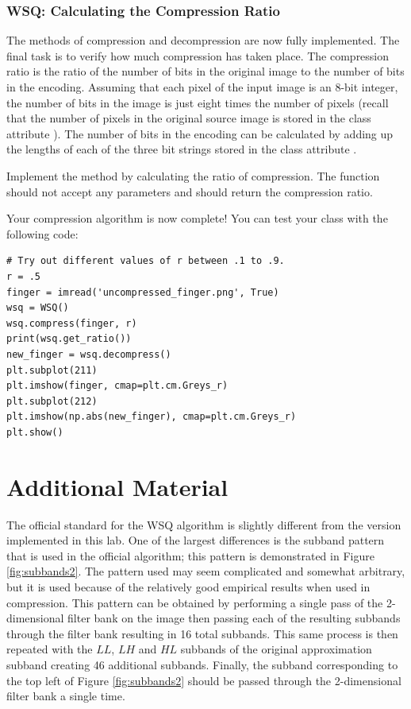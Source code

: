 \subsubsection*{WSQ: Calculating the Compression Ratio}
The methods of compression and decompression are now fully implemented. The final task is to verify how much compression has taken place.
The compression ratio is the ratio of the number of bits in the original image to the number of bits in the encoding.
Assuming that each pixel of the input image is an 8-bit integer, the number of bits in the image is just eight times the number of pixels
(recall that the number of pixels in the original source image is stored in the class attribute ).
The number of bits in the encoding can be calculated by adding up the lengths of each of the three bit strings stored in the class attribute .
\begin{problem}
Implement the method  by calculating the ratio of compression.
The function should not accept any parameters and should return the compression ratio.

Your compression algorithm is now complete!
You can test your class with the following code:
\begin{lstlisting}
# Try out different values of r between .1 to .9.
r = .5
finger = imread('uncompressed_finger.png', True)
wsq = WSQ()
wsq.compress(finger, r)
print(wsq.get_ratio())
new_finger = wsq.decompress()
plt.subplot(211)
plt.imshow(finger, cmap=plt.cm.Greys_r)
plt.subplot(212)
plt.imshow(np.abs(new_finger), cmap=plt.cm.Greys_r)
plt.show()
\end{lstlisting}
\end{problem}
\newpage

\section*{Additional Material} %

The official standard for the WSQ algorithm is slightly different from the version implemented in this lab.
One of the largest differences is the subband pattern that is used in the official algorithm; this pattern is demonstrated in Figure \ref{fig:subbands2}.
The pattern used may seem complicated and somewhat arbitrary, but it is used because of the relatively good empirical results when used in compression.
This pattern can be obtained by performing a single pass of the 2-dimensional filter bank on the image then passing each of the resulting subbands through the filter bank resulting in 16 total subbands.
This same process is then repeated with the $LL$, $LH$ and $HL$ subbands of the original approximation subband creating 46 additional subbands.
Finally, the subband corresponding to the top left of Figure \ref{fig:subbands2} should be passed through the 2-dimensional filter bank a single time.

